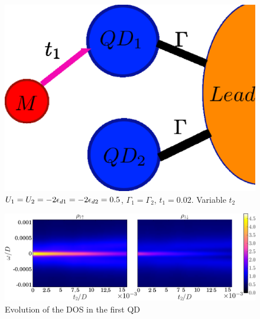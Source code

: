 \begin{figure}[h]
\centering
\includegraphics[scale=0.2]{Plots/Model/Majorana-1QD.eps}
\caption{\label{fig:Mod/Shift_t2}$U_{1}=U_{2}=-2\epsilon_{d1}=-2\epsilon_{d2}=0.5$, $\Gamma_{1}=\Gamma_{2}$,
$t_{1}=0.02$. Variable $t_2$}
\end{figure}


\begin{figure}[hbt]
\centering
\includegraphics[scale=0.38]{Plots/2D/Shift_t2D1.png}
\caption{\label{fig:DOS/Shift_t2D1} Evolution of the DOS in the first QD }
\end{figure}



